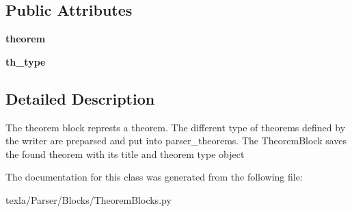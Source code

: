 \subsection*{Public Attributes}
\begin{DoxyCompactItemize}
\item 
\hypertarget{classtexla_1_1Parser_1_1Blocks_1_1TheoremBlocks_1_1TheoremBlock_aea09c62cdfb8b60f7408be067f22277a}{}\label{classtexla_1_1Parser_1_1Blocks_1_1TheoremBlocks_1_1TheoremBlock_aea09c62cdfb8b60f7408be067f22277a} 
{\bfseries theorem}
\item 
\hypertarget{classtexla_1_1Parser_1_1Blocks_1_1TheoremBlocks_1_1TheoremBlock_a3f93bd7c5f34eddf7bd0913e2d579dd6}{}\label{classtexla_1_1Parser_1_1Blocks_1_1TheoremBlocks_1_1TheoremBlock_a3f93bd7c5f34eddf7bd0913e2d579dd6} 
{\bfseries th\+\_\+type}
\end{DoxyCompactItemize}


\subsection{Detailed Description}
\begin{DoxyVerb}The theorem block represts a theorem.
The different type of theorems defined by the
writer are preparsed and put into parser_theorems.
The TheoremBlock saves the found theorem with its
title and theorem type object \end{DoxyVerb}
 

The documentation for this class was generated from the following file\+:\begin{DoxyCompactItemize}
\item 
texla/\+Parser/\+Blocks/Theorem\+Blocks.\+py\end{DoxyCompactItemize}

